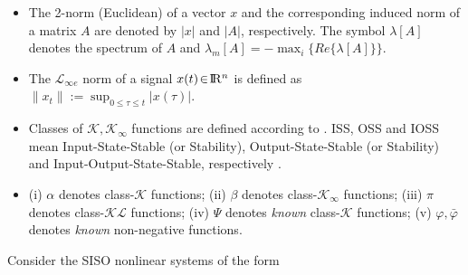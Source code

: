 \documentclass{rncauth}
\def\re{{\rm I}\! {\rm R}}
\begin{document}

\begin{itemize}

\item The 2-norm (Euclidean) of a vector $x$ and the corresponding
induced norm of a matrix $A$ are denoted by $|x|$ and $|A|$,
respectively. The symbol $\lambda[A]$ denotes the spectrum of $A$
and $\lambda_m[A]=-\max_i\{Re\{\lambda[A]\}\}$.


\item The ${\mathcal{L}}_{\infty e}$ norm of a signal
$x(t)\!\in\!\re^n$ is defined as
$\|x_{t}\|\!:=\!\sup_{0\!\leq\!\tau\!\leq\!t} |x(\tau)|$.





\item Classes of $\mathcal{K}, \mathcal{K}_\infty$ functions are
defined according to \cite[p.~144]{K:02}. ISS, OSS and IOSS mean
Input-State-Stable (or Stability), Output-State-Stable (or
Stability) and Input-Output-State-Stable, respectively
\cite{SW:95}.


\item (i) $\alpha$ denotes class-$\mathcal{K}$ functions; (ii)
$\beta$ denotes class-$\mathcal{K}_\infty$ functions; (iii) $\pi$
denotes class-$\mathcal{KL}$ functions; (iv) $\Psi$ denotes {\em
known} class-$\mathcal{K}$ functions; (v) $\varphi, \bar{\varphi}$
denotes {\em known} non-negative functions.
\end{itemize}
%
Consider the SISO nonlinear systems of the form
\end{document}
